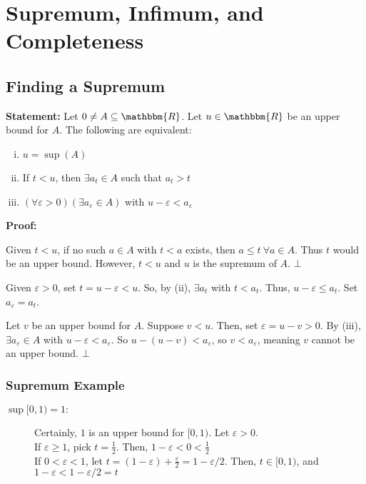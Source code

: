 \documentclass[10pt]{extarticle}
\newcommand{\R}{\mathbbm{R}}
\begin{document}
  \section{Supremum, Infimum, and Completeness}%
  \subsection{Finding a Supremum}%
  \textbf{Statement:} Let $0\neq A\subseteq \R$. Let $u\in\R$ be an upper bound for $A$. The following are equivalent:
    \begin{enumerate}[(i)]
      \item $u=\sup(A)$
      \item If $t<u$, then $\exists a_t\in A$ such that $a_t > t$
      \item $(\forall \varepsilon > 0)(\exists a_{\varepsilon}\in A)$ with $u-\varepsilon < a_{\varepsilon}$
    \end{enumerate}
    \textbf{Proof:}
      \begin{description}[font=\normalfont]
        \item[(i) $\Rightarrow$ (ii):] Given $t < u$, if no such $a\in A$ with $t < a$ exists, then $a \leq t~\forall a\in A$. Thus $t$ would be an upper bound. However, $t < u$ and $u$ is the supremum of $A$. $\bot$
        \item[(ii) $\Rightarrow$ (iii):] Given $\varepsilon > 0$, set $t = u-\varepsilon < u$. So, by (ii), $\exists a_t$ with $t < a_t$. Thus, $u-\varepsilon \leq a_t$. Set $a_{\varepsilon} = a_t$.
        \item[(iii) $\Rightarrow$ (i):] Let $v$ be an upper bound for $A$. Suppose $v < u$. Then, set $\varepsilon = u-v > 0$. By (iii), $\exists a_{\varepsilon}\in A$ with $u-\varepsilon < a_{\varepsilon}$. So $u-(u-v) < a_{\varepsilon}$, so $v < a_{\varepsilon}$, meaning $v$ cannot be an upper bound. $\bot$
      \end{description}
      \subsubsection{Supremum Example}%
      \begin{description}
        \item[$\sup [0,1) = 1:$] Certainly, $1$ is an upper bound for $[0,1)$. Let $\varepsilon > 0$.\\

          If $\varepsilon \geq 1$, pick $t = \frac{1}{2}$. Then, $1-\varepsilon < 0 < \frac{1}{2}$\\

          If $0 < \varepsilon < 1$, let $t = (1-\varepsilon) + \frac{\varepsilon}{2} = 1-\varepsilon/2$. Then, $t\in [0,1)$, and $1-\varepsilon < 1-\varepsilon/2 = t$
      \end{description}
\end{document}
